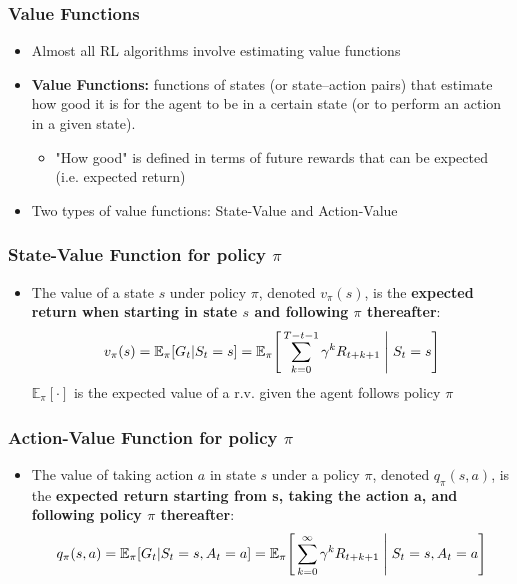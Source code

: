 \documentclass{beamer}
\begin{document}

\begin{frame}
\frametitle{Value Functions}
\begin{itemize}
\item Almost all RL algorithms involve estimating value functions
\item \textbf{Value Functions:} functions of states (or state--action pairs) that estimate how good it is for the agent to be in a certain state (or to perform an action in a given state). 
   \begin{itemize}
   	\item "How good" is defined in terms of future rewards that can be expected (i.e. expected return)
      \end{itemize}
\item Two types of value functions: State-Value and Action-Value
\end{itemize}
\end{frame}


\begin{frame}
\frametitle{State-Value Function for policy $\pi$}
\begin{itemize}
\item The value of a state $s$ under policy $\pi$, denoted $v_\pi(s)$, is the \textbf{expected return when starting in state $s$ and following $\pi$ thereafter}:
\begin{equation}
v_\pi(s) = \mathbb{E}_\pi[G_t | S_t = s] = \mathbb{E}_\pi\Bigg[\sum_{k=0}^{T-t-1} \gamma^k R_{t+k+1} \Biggm\lvert S_t = s \Bigg]
\nonumber
\end{equation}
$\mathbb{E}_\pi[\cdot]$ is the expected value of a r.v. given the agent follows policy $\pi$
\end{itemize}
\end{frame}



\begin{frame}
\frametitle{Action-Value Function for policy $\pi$}
\begin{itemize}
\item The value of taking action $a$ in state $s$ under a policy $\pi$, denoted
$q_\pi(s,a)$, is the \textbf{expected return starting from s, taking the action a, and following policy $\pi$ thereafter}:
\begin{equation}
q_\pi(s,a) = \mathbb{E}_\pi[G_t | S_t = s, A_t = a] = \mathbb{E}_\pi\Bigg[\sum_{k=0}^{\infty} \gamma^k R_{t+k+1} \Biggm\lvert S_t = s, A_t = a \Bigg]
\nonumber
\end{equation}
\end{itemize}
\end{frame}
\end{document}
